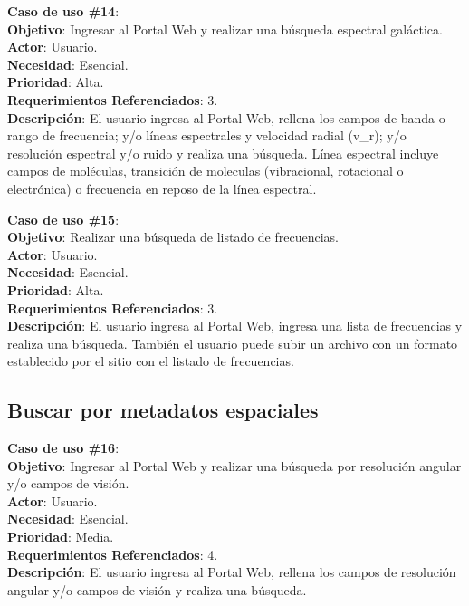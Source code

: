 \noindent\textbf{Caso de uso \#14}: \\
\noindent\textbf{Objetivo}: Ingresar al Portal Web y realizar una búsqueda espectral galáctica. \\
\textbf{Actor}: Usuario.\\
\textbf{Necesidad}: Esencial.\\
\textbf{Prioridad}: Alta.\\
\textbf{Requerimientos Referenciados}: 3. \\
\textbf{Descripción}: El usuario ingresa al Portal Web, rellena los campos de banda o rango de frecuencia;  y/o líneas espectrales y velocidad radial (v\_r); y/o resolución espectral y/o ruido y realiza una búsqueda.  Línea espectral incluye campos de moléculas, transición de moleculas (vibracional, rotacional o electrónica) o frecuencia en reposo de la línea espectral.
\vspace{1.0cm}

\noindent\textbf{Caso de uso \#15}: \\
\noindent\textbf{Objetivo}: Realizar una búsqueda de listado de frecuencias. \\
\textbf{Actor}: Usuario.\\
\textbf{Necesidad}: Esencial.\\
\textbf{Prioridad}: Alta.\\
\textbf{Requerimientos Referenciados}: 3. \\
\textbf{Descripción}: El usuario ingresa al Portal Web, ingresa una lista de frecuencias y realiza una búsqueda. También el usuario puede subir un archivo con un formato establecido por el sitio con el listado de frecuencias.
\vspace{1.0cm}

\subsection{Buscar por metadatos espaciales}
\noindent\textbf{Caso de uso \#16}: \\
\noindent\textbf{Objetivo}: Ingresar al Portal Web y realizar una búsqueda por resolución angular y/o campos de visión. \\
\textbf{Actor}: Usuario.\\
\textbf{Necesidad}: Esencial.\\
\textbf{Prioridad}: Media.\\
\textbf{Requerimientos Referenciados}: 4. \\
\textbf{Descripción}: El usuario ingresa al Portal Web, rellena los campos de resolución angular y/o campos de visión y realiza una búsqueda.
\vspace{1.0cm}

